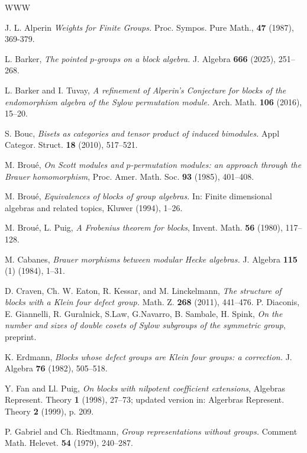 \documentclass{amsart}
\theoremstyle{plain}\newtheorem{Theorem}{Theorem}[section]
\theoremstyle{plain}\newtheorem{Conjecture}[Theorem]{Conjecture}
\theoremstyle{plain}\newtheorem{Corollary}[Theorem]{Corollary}
\theoremstyle{plain}\newtheorem{Lemma}[Theorem]{Lemma}
\theoremstyle{plain}\newtheorem{Proposition}[Theorem]{Proposition}
\theoremstyle{definition}\newtheorem{Definition}[Theorem]{Definition}
\theoremstyle{definition}\newtheorem{Example}[Theorem]{Example}
\theoremstyle{definition}\newtheorem{Examples}[Theorem]{Examples}
\theoremstyle{definition}\newtheorem{Exercise}[Theorem]{Exercise}
\theoremstyle{definition}\newtheorem{Notation}[Theorem]{Notation}
\theoremstyle{definition}\newtheorem{Remark}[Theorem]{Remark}
\theoremstyle{definition}\newtheorem{Remarks}[Theorem]{Remarks}
\theoremstyle{plain}\newtheorem{Statement}[Theorem]{}
\begin{document}
\begin{thebibliography}{WWW}

 J. L. Alperin {\em Weights for Finite Groups.} Proc. Sympos. Pure 
Math., {\bf 47} (1987), 369-379.

 L. Barker, {\em The pointed $p$-groups on a block algebra.}
J. Algebra {\bf 666} (2025), 251--268.

 L. Barker and I. Tuvay, {\em A refinement of Alperin's Conjecture
for blocks of the endomorphism algebra of the Sylow permutation module.}
Arch. Math. {\bf 106} (2016), 15--20.

 S. Bouc, {\em Bisets as categories and tensor product of
induced bimodules.} Appl Categor. Struct. {\bf 18} (2010), 517--521.

 M. Brou\'e, {\em On Scott modules and $p$-permutation
modules: an approach through the Brauer homomorphism}, Proc. Amer.
Math. Soc. {\bf 93} (1985), 401--408.

 M. Brou\'e, {\em Equivalences of blocks of group algebras.}
In: Finite dimensional algebras and related topics, Kluwer (1994), 1--26. 

 M. Brou\'e, L. Puig, {\em A Frobenius theorem for 
blocks}, Invent. Math. {\bf 56} (1980), 117--128.

  M. Cabanes, {\em Brauer morphisms between modular Hecke 
algebras.}   J. Algebra {\bf 115} (1) (1984), 1--31.

 D. Craven, Ch. W. Eaton, R. Kessar, and M. Linckelmann, {\em The
structure of blocks with a Klein four defect group.} Math. Z. {\bf 268} (2011),
441--476. 
 P. Diaconis, E. Giannelli, R. Guralnick,  S.Law,  G.Navarro, 
B. Sambale, H. Spink, {\em On the number and sizes of  double cosets of  
Sylow subgroups of  the symmetric group}, preprint.


 K. Erdmann, {\em Blocks whose defect groups are Klein four
groups: a correction.} J. Algebra {\bf 76} (1982), 505--518.

 Y. Fan and Ll. Puig, {\em On blocks with nilpotent coefficient
extensions}, Algebras Represent. Theory {\bf 1} (1998), 27--73;  updated
version in: Algerbras Represent. Theory {\bf 2} (1999), p. 209. %

 P. Gabriel and Ch. Riedtmann, {\em Group representations
without groups.} Comment Math. Helevet. {\bf 54} (1979), 240--287.


\end{thebibliography}
\end{document}

